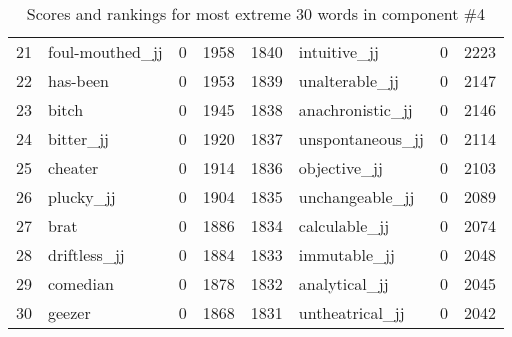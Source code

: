 \begin{table}[tbp]
\begin{tabular}{| rlr@{.}l | rlr@{.}l |}
    21 & foul-mouthed\_jj & 0 & 1958    &    1840 & intuitive\_jj & 0 & 2223 \\
    22 & has-been & 0 & 1953    &    1839 & unalterable\_jj & 0 & 2147 \\
    23 & bitch & 0 & 1945    &    1838 & anachronistic\_jj & 0 & 2146 \\
    24 & bitter\_jj & 0 & 1920    &    1837 & unspontaneous\_jj & 0 & 2114 \\
    25 & cheater & 0 & 1914    &    1836 & objective\_jj & 0 & 2103 \\
    26 & plucky\_jj & 0 & 1904    &    1835 & unchangeable\_jj & 0 & 2089 \\
    27 & brat & 0 & 1886    &    1834 & calculable\_jj & 0 & 2074 \\
    28 & driftless\_jj & 0 & 1884    &    1833 & immutable\_jj & 0 & 2048 \\
    29 & comedian & 0 & 1878    &    1832 & analytical\_jj & 0 & 2045 \\
    30 & geezer & 0 & 1868    &    1831 & untheatrical\_jj & 0 & 2042 \\
    \hline
    \end{tabular}
    \caption{Scores and rankings for most extreme 30 words in component \#4} 
\end{table}
\clearpage
